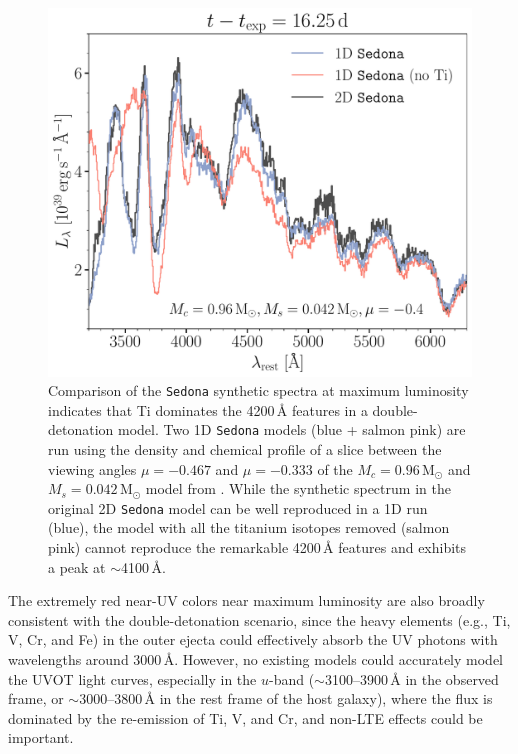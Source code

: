 \documentclass[twocolumn]{aastex631}
\begin{document}
\begin{CJK*}{UTF8}{gbsn}
\begin{figure}
    \centering
    \includegraphics[width=\linewidth]{Ti_II.pdf}
    \caption{Comparison of the \texttt{Sedona} synthetic spectra at maximum luminosity indicates that Ti dominates the 4200\,\r{A} features in a double-detonation model. Two 1D \texttt{Sedona} models (blue + salmon pink) are run using the density and chemical profile of a slice between the viewing angles $\mu=-0.467$ and $\mu=-0.333$ of the $M_c=0.96\,\mathrm{M_\odot}$ and $M_s=0.042\,\mathrm{M_\odot}$ model from \citet{Boos_2021}. While the synthetic spectrum in the original 2D \texttt{Sedona} model can be well reproduced in a 1D run (blue), the model with all the titanium isotopes removed (salmon pink) cannot reproduce the remarkable 4200\,\r{A} features and exhibits a peak at $\sim$4100\,\r{A}.}
    \label{fig:Ti}
\end{figure}

The extremely red near-UV colors near maximum luminosity are also broadly consistent with the double-detonation scenario, since the heavy elements (e.g., Ti, V, Cr, and Fe) in the outer ejecta could effectively absorb the UV photons with wavelengths around 3000\,\r{A}. 
However, no existing models could accurately model the UVOT light curves, especially in the $u$-band ($\sim$3100--3900\,\r{A} in the observed frame, or $\sim$3000--3800\,\r{A} in the rest frame of the host galaxy), where the flux is dominated by the re-emission of Ti, V, and Cr, and non-LTE effects could be important.


\end{CJK*}
\end{document}
